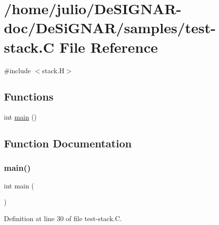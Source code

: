 \hypertarget{test-stack_8_c}{}\section{/home/julio/\+De\+S\+I\+G\+N\+A\+R-\/doc/\+De\+Si\+G\+N\+A\+R/samples/test-\/stack.C File Reference}
\label{test-stack_8_c}
{\ttfamily \#include $<$stack.\+H$>$}\newline
\subsection*{Functions}
\begin{DoxyCompactItemize}
\item 
int \hyperlink{test-stack_8_c_ae66f6b31b5ad750f1fe042a706a4e3d4}{main} ()
\end{DoxyCompactItemize}


\subsection{Function Documentation}
\mbox{\label{test-stack_8_c_ae66f6b31b5ad750f1fe042a706a4e3d4}} 
\subsubsection{\texorpdfstring{main()}{main()}}
{\footnotesize\ttfamily int main (\begin{DoxyParamCaption}{ }\end{DoxyParamCaption})}



Definition at line 30 of file test-\/stack.\+C.

